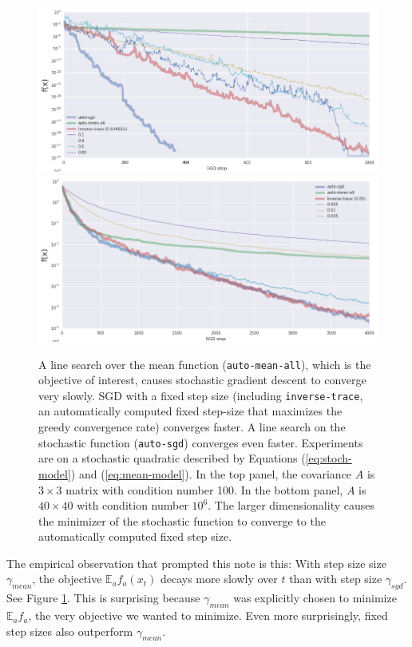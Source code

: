 \documentclass{article}
\newcommand{\E}{\mathbb{E}}
\begin{document}
\begin{figure}
    \centering
    \includegraphics[width=12cm]{cond=20-dim=3}
    \includegraphics[width=12cm]{cond=1e6-dim=40}
    \caption{A line search over the mean function ({\tt auto-mean-all}), which is the objective of interest, causes stochastic gradient descent to converge very slowly. SGD with a fixed step size (including {\tt inverse-trace}, an automatically computed fixed step-size that maximizes the greedy convergence rate) converges faster. A line search on the stochastic function ({\tt auto-sgd}) converges even faster. Experiments are on a stochastic quadratic described by Equations (\ref{eq:stoch-model}) and (\ref{eq:mean-model}). In the top panel, the covariance $A$ is $3\times 3$ matrix with condition number 100. In the bottom panel, $A$ is $40\times 40$ with condition number $10^6$. The larger dimensionality causes the minimizer of the stochastic function to converge to the automatically computed fixed step size.}
    \label{fig:emp}
\end{figure}

The empirical observation that prompted this note is this: With step size size $\gamma_{mean}$, the objective $\E_a f_a(x_t)$ decays more slowly over $t$ than with step size $\gamma_{sgd}$. See Figure \ref{fig:emp}. This is surprising because $\gamma_{mean}$ was explicitly chosen to minimize $\E_a f_a$, the very objective we wanted to minimize. Even more surprisingly, fixed step sizes also outperform $\gamma_{mean}$.
\end{document}
